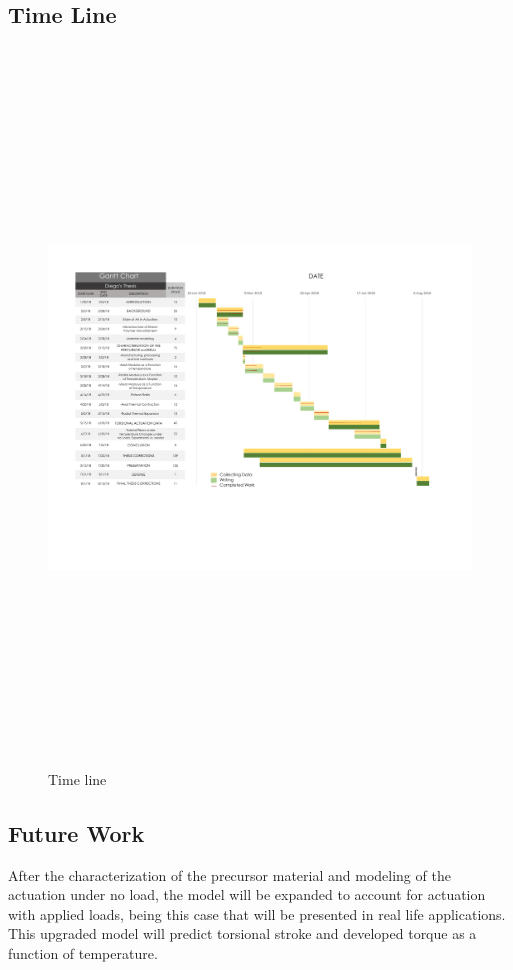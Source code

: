\documentclass[12pt,oneside]{article}
\begin{document}
\subsection*{Time Line}
\begin{figure}[H]
\hspace{-4cm}
	\includegraphics[clip,trim=1.8cm 0 0 1.4cm,width=24cm,height=19cm, angle=-90]{finalganttchart.pdf}
\caption{Time line}\label{fig:Time line}
\end{figure}



\subsection*{Future Work}
\hspace{0.4cm} After the characterization of the precursor material and modeling of the actuation under no load, the model will be expanded to account for actuation with applied loads, being this case that will be presented in real life applications. This upgraded model will predict torsional stroke and developed torque as a function of temperature. \par 
\end{document}
